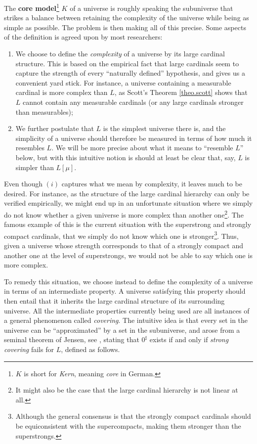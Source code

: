 \documentclass[../../main]{subfiles}
\begin{document}
The \textbf{core model}\footnote{$K$ is short for \textit{Kern}, meaning \textit{core} in German.} $K$ of a universe is roughly speaking the subuniverse that strikes a balance between retaining the complexity of the universe while being as simple as possible. The problem is then making all of this precise. Some aspects of the definition is agreed upon by most researchers:
\begin{enumerate}
  \item We choose to define the \textit{complexity} of a universe by its large cardinal structure. This is based on the empirical fact that large cardinals seem to capture the strength of every ``naturally defined'' hypothesis, and gives us a convenient yard stick. For instance, a universe containing a measurable cardinal is more complex than $L$, as Scott's Theorem \ref{theo.scott} shows that $L$ cannot contain any measurable cardinals (or any large cardinals stronger than measurables);
  \item We further postulate that $L$ is the simplest universe there is, and the simplicity of a universe should therefore be measured in terms of how much it resembles $L$. We will be more precise about what it means to ``resemble $L$'' below, but with this intuitive notion is should at least be clear that, say, $L$ is simpler than $L[\mu]$.\\
\end{enumerate}

Even though $(i)$ captures what we mean by complexity, it leaves much to be desired. For instance, as the structure of the large cardinal hierarchy can only be verified empirically, we might end up in an unfortunate situation where we simply do not know whether a given universe is more complex than another one\footnote{It might also be the case that the large cardinal hierarchy is not linear at all.}. The famous example of this is the current situation with the superstrong and strongly compact cardinals, that we simply do not know which one is stronger\footnote{Although the general consensus is that the strongly compact cardinals should be equiconsistent with the supercompacts, making them stronger than the superstrongs.}. Thus, given a universe whose strength corresponds to that of a strongly compact and another one at the level of superstrongs, we would not be able to say which one is more complex. 

\qquad To remedy this situation, we choose instead to define the complexity of a universe in terms of an intermediate property. A universe satisfying this property should then entail that it inherits the large cardinal structure of its surrounding universe. All the intermediate properties currently being used are all instances of a general phenomenon called \textit{covering}. The intuitive idea is that every set in the universe can be ``approximated'' by a set in the subuniverse, and arose from a seminal theorem of Jensen, see \cite[11.56]{SchindlerBook}, stating that $0^\sharp$ exists if and only if \textit{strong covering} fails for $L$, defined as follows.
\end{document}
